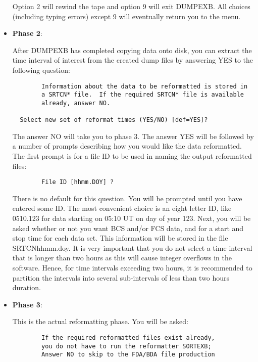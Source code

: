 \begin{itemize}
Option 2 will rewind the tape and option 9 will exit DUMPEXB. All choices
(including typing errors) except 9 will eventually return  you to the menu.

\item{\bf Phase 2}:

After DUMPEXB has completed copying data onto disk, you can extract
the time interval of interest from the created dump files by
answering YES to the following question:
\begin{verbatim}
        Information about the data to be reformatted is stored in
        a SRTCN* file.  If the required SRTCN* file is available
        already, answer NO.

  Select new set of reformat times (YES/NO) [def=YES]?
\end{verbatim}
The answer NO will take you to phase 3. The answer YES will be
followed by a number of prompts describing how you would like the data
reformatted. The first prompt is for a file ID to be used in naming the output
reformatted files:
\begin{verbatim}
        File ID [hhmm.DOY] ?
\end{verbatim}
There is no default for this question. You will be prompted until you
have entered some ID. The most convenient choice is an eight letter ID,  like
0510.123 for data starting on 05:10 UT on day of year 123. Next, you will be
asked  whether or not you want BCS and/or FCS data,  and for a start and stop
time for each data set. This information will be stored in the file
SRTCNhhmm.doy. It is very important that you do not select a time interval
that is longer than  two hours as this will cause integer overflows in the
software. Hence, for time intervals exceeding two hours,  it is recommended to
partition the intervals into several sub-intervals of less than two hours
duration.

\item{\bf Phase 3}:

This is the actual reformatting phase. You will be asked:
\begin{verbatim}
        If the required reformatted files exist already,
        you do not have to run the reformatter SORTEXB;
        Answer NO to skip to the FDA/BDA file production


\end{verbatim}
\end{itemize}
